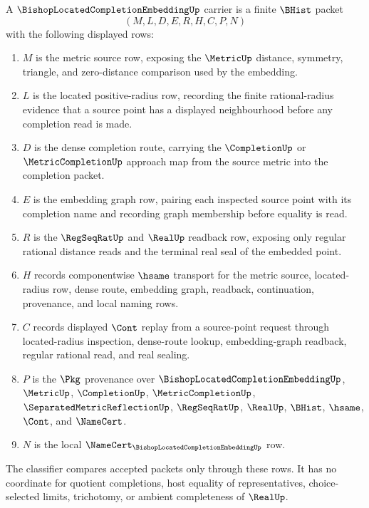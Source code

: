 \begin{definition}
\label{def:bishop-located-completion-embedding-carrier}
A $\BishopLocatedCompletionEmbeddingUp$ carrier is a finite $\BHist$ packet
$$
(M,L,D,E,R,H,C,P,N)
$$
with the following displayed rows:
\begin{enumerate}
\item $M$ is the metric source row, exposing the $\MetricUp$ distance, symmetry, triangle, and zero-distance comparison used by the embedding.
\item $L$ is the located positive-radius row, recording the finite rational-radius evidence that a source point has a displayed neighbourhood before any completion read is made.
\item $D$ is the dense completion route, carrying the $\CompletionUp$ or $\MetricCompletionUp$ approach map from the source metric into the completion packet.
\item $E$ is the embedding graph row, pairing each inspected source point with its completion name and recording graph membership before equality is read.
\item $R$ is the $\RegSeqRatUp$ and $\RealUp$ readback row, exposing only regular rational distance reads and the terminal real seal of the embedded point.
\item $H$ records componentwise $\hsame$ transport for the metric source, located-radius row, dense route, embedding graph, readback, continuation, provenance, and local naming rows.
\item $C$ records displayed $\Cont$ replay from a source-point request through located-radius inspection, dense-route lookup, embedding-graph readback, regular rational read, and real sealing.
\item $P$ is the $\Pkg$ provenance over $\BishopLocatedCompletionEmbeddingUp$, $\MetricUp$, $\CompletionUp$, $\MetricCompletionUp$, $\SeparatedMetricReflectionUp$, $\RegSeqRatUp$, $\RealUp$, $\BHist$, $\hsame$, $\Cont$, and $\NameCert$.
\item $N$ is the local $\NameCert_{\BishopLocatedCompletionEmbeddingUp}$ row.
\end{enumerate}
The classifier compares accepted packets only through these rows. It has no coordinate for quotient completions, host equality of representatives, choice-selected limits, trichotomy, or ambient completeness of $\RealUp$.
\end{definition}

